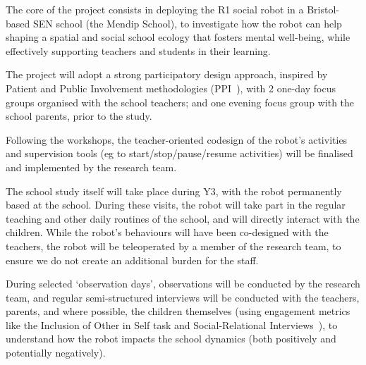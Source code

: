 \documentclass[11pt,a4paper]{report}
\begin{document}
The core of the project consists in deploying the R1 social robot in a
Bristol-based SEN school (the Mendip School), to investigate how the robot can
help shaping a spatial and social school ecology that fosters mental well-being,
while effectively supporting teachers and students in their learning. 

The project will adopt a strong participatory design approach, inspired by
Patient and Public Involvement methodologies (PPI~\cite{boivin2010patient}), with 2 one-day
focus groups organised with the school teachers; and one evening focus group with the
school parents, prior to the study.


Following the workshops, the teacher-oriented codesign of the robot's activities
and supervision tools (eg to start/stop/pause/resume activities) will be
finalised and implemented by the research team.

The school study itself will take place during Y3, with the robot permanently
based at the school. During these visits, the robot will take part in the
regular teaching and other daily routines of the school, and will directly
interact with the children. While the robot's behaviours will have been
co-designed with the teachers, the robot will be teleoperated by a member of the
research team, to ensure we do not create an additional burden for the staff. 

During selected `observation days', observations will be conducted by the research team,
and regular semi-structured interviews will be conducted with the teachers,
parents, and where possible, the children themselves (using engagement metrics
like the Inclusion of Other in Self task
and Social-Relational Interviews~\cite{westlund2017measuring}), to understand how the
robot impacts the school dynamics  (both positively and potentially negatively).
\end{document}
